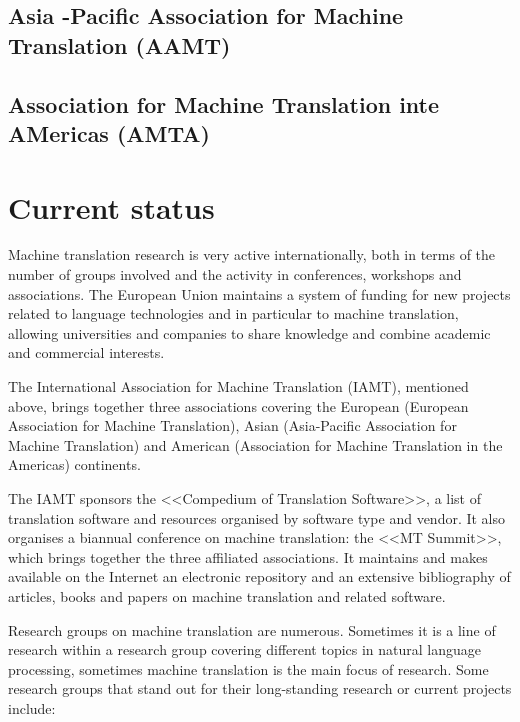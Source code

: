 \documentclass[a4paper]{article}
\theoremstyle{plain}
\theoremstyle{definition}
\begin{document}
	\subsection{Asia -Pacific Association for Machine Translation (AAMT)}
	\subsection{Association for Machine Translation inte AMericas (AMTA)}
	
	
	
	
	
	\section{Current status}
	\begin{flushleft}
	Machine translation research is very active internationally, both in terms of the number of groups involved and the activity in conferences, workshops and associations. The European Union maintains a system of funding for new projects related to language technologies and in particular to machine translation, allowing universities and companies to share knowledge and combine academic and commercial interests.\par

    The International Association for Machine Translation (IAMT), mentioned above, brings together three associations covering the European (European Association for Machine Translation), Asian (Asia-Pacific Association for Machine Translation) and American (Association for Machine Translation in the Americas) continents.\par

    The IAMT sponsors the <<Compedium of Translation Software>>, a list of translation software and resources organised by software type and vendor. It also organises a biannual conference on machine translation: the <<MT Summit>>, which brings together the three affiliated associations. It maintains and makes available on the Internet an electronic repository and an extensive bibliography of articles, books and papers on machine translation and related software.\par

    Research groups on machine translation are numerous. Sometimes it is a line of research within a research group covering different topics in natural language processing, sometimes machine translation is the main focus of research. Some research groups that stand out for their long-standing research or current projects include:
   

\end{flushleft}
\end{document}
